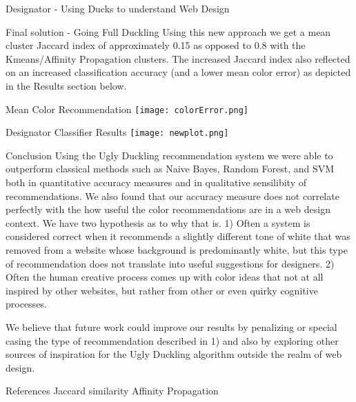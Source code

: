 \documentclass{beamer}
\begin{document}
\begin{frame}{\centerline{\Huge Designator - Using Ducks to understand Web Design}}
\begin{textblock}{5}
\begin{block}{Final solution - Going Full Duckling}
Using this new approach we get a mean cluster Jaccard index of approximately 0.15 as opposed to 0.8 with the
Kmeans/Affinity Propagation clusters. The increased Jaccard index also reflected on an increased classification accuracy
(and a lower mean color error) as depicted in the Results section below.

\end{block}
\begin{block}{Mean Color Recommendation}
\texttt{[image: colorError.png]}
\end{block}
\begin{block}{Designator Classifier Results}
\texttt{[image: newplot.png]}
\end{block}

\begin{block}{Conclusion}
Using the Ugly Duckling recommendation system we were able to outperform classical methods such as Naive Bayes, Random
Forest, and SVM both in quantitative accuracy measures and in qualitative sensilibity of recommendations. We also found
that our accuracy measure does not correlate perfectly with the how useful the color recommendations are in a web design
context. We have two hypothesis as to why that is. 1) Often a system is considered correct when it recommends a slightly
different tone of white that was removed from a website whose background is predominantly white, but this type of
recommendation does not translate into useful suggestions for designers. 2) Often the human creative process comes up
with
color ideas that not at all inspired by other websites, but rather from other or even quirky cognitive processes.

We believe that future work could improve our results by penalizing or special casing the type of recommendation
described in 1) and also by exploring other sources of inspiration for the Ugly Duckling algorithm outside the realm of
web design.
\end{block}

\begin{block}{References}
Jaccard similarity
Affinity Propagation
\end{block}

\end{textblock}


\end{frame}
\end{document}
